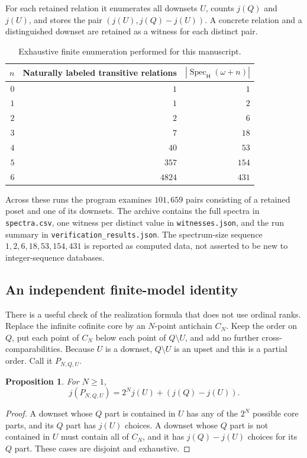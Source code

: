 \documentclass[11pt,a4paper]{article}
\newtheorem{proposition}[proposition]{Proposition}
\theoremstyle{definition}
\newcommand{\HH}{\mathsf H}
\newcommand{\Spec}{\operatorname{Spec}_{\HH}}
\numberwithin{equation}{section}
\begin{document}
For each retained relation it enumerates all downsets $U$, counts
$j(Q)$ and $j(U)$, and stores the pair
$(j(U),j(Q)-j(U))$.  A concrete relation and a distinguished downset
are retained as a witness for each distinct pair.

\begin{table}[htbp]
\centering
\begin{tabular}{@{}rrr@{}}
\toprule
$n$ & Naturally labeled transitive relations & $|\Spec(\omega+n)|$\\
\midrule
$0$ & $1$ & $1$\\
$1$ & $1$ & $2$\\
$2$ & $2$ & $6$\\
$3$ & $7$ & $18$\\
$4$ & $40$ & $53$\\
$5$ & $357$ & $154$\\
$6$ & $4824$ & $431$\\
\bottomrule
\end{tabular}
\caption{Exhaustive finite enumeration performed for this manuscript.}
\label{tab:counts}
\end{table}

Across these runs the program examines $101{,}659$ pairs consisting of
a retained poset and one of its downsets.  The archive contains the
full spectra in \texttt{spectra.csv}, one witness per distinct value in
\texttt{witnesses.json}, and the run summary in
\texttt{verification\_results.json}.  The spectrum-size sequence
$1,2,6,18,53,154,431$ is reported as computed data, not asserted to be
new to integer-sequence databases.

\subsection{An independent finite-model identity}

There is a useful check of the realization formula that does not use
ordinal ranks.  Replace the infinite cofinite core by an $N$-point
antichain $C_N$.  Keep the order on $Q$, put each point of $C_N$ below
each point of $Q\setminus U$, and add no further cross-comparabilities.
Because $U$ is a downset, $Q\setminus U$ is an upset and this is a
partial order.  Call it $P_{N,Q,U}$.

\begin{proposition}\label{prop:finitecheck}
For $N\geq1$,
\[
 j(P_{N,Q,U})=2^N j(U)+(j(Q)-j(U)).
\]
\end{proposition}
\begin{proof}
A downset whose $Q$ part is contained in $U$ has any of the $2^N$
possible core parts, and its $Q$ part has $j(U)$ choices.  A downset
whose $Q$ part is not contained in $U$ must contain all of $C_N$,
and it has $j(Q)-j(U)$ choices for its $Q$ part.  These cases are
disjoint and exhaustive.
\end{proof}
\end{document}
